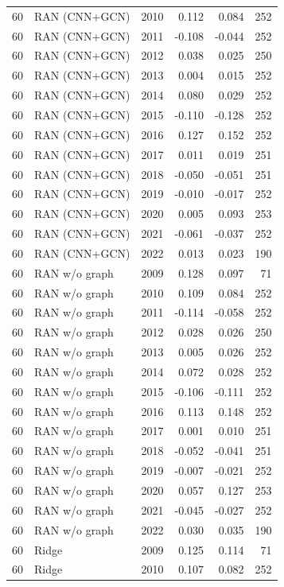\begin{table}[htbp]
{\begin{tabular}{llrrrr}
60 & RAN (CNN+GCN) & 2010 & 0.112 & 0.084 & 252 \\
60 & RAN (CNN+GCN) & 2011 & -0.108 & -0.044 & 252 \\
60 & RAN (CNN+GCN) & 2012 & 0.038 & 0.025 & 250 \\
60 & RAN (CNN+GCN) & 2013 & 0.004 & 0.015 & 252 \\
60 & RAN (CNN+GCN) & 2014 & 0.080 & 0.029 & 252 \\
60 & RAN (CNN+GCN) & 2015 & -0.110 & -0.128 & 252 \\
60 & RAN (CNN+GCN) & 2016 & 0.127 & 0.152 & 252 \\
60 & RAN (CNN+GCN) & 2017 & 0.011 & 0.019 & 251 \\
60 & RAN (CNN+GCN) & 2018 & -0.050 & -0.051 & 251 \\
60 & RAN (CNN+GCN) & 2019 & -0.010 & -0.017 & 252 \\
60 & RAN (CNN+GCN) & 2020 & 0.005 & 0.093 & 253 \\
60 & RAN (CNN+GCN) & 2021 & -0.061 & -0.037 & 252 \\
60 & RAN (CNN+GCN) & 2022 & 0.013 & 0.023 & 190 \\
60 & RAN w/o graph & 2009 & 0.128 & 0.097 & 71 \\
60 & RAN w/o graph & 2010 & 0.109 & 0.084 & 252 \\
60 & RAN w/o graph & 2011 & -0.114 & -0.058 & 252 \\
60 & RAN w/o graph & 2012 & 0.028 & 0.026 & 250 \\
60 & RAN w/o graph & 2013 & 0.005 & 0.026 & 252 \\
60 & RAN w/o graph & 2014 & 0.072 & 0.028 & 252 \\
60 & RAN w/o graph & 2015 & -0.106 & -0.111 & 252 \\
60 & RAN w/o graph & 2016 & 0.113 & 0.148 & 252 \\
60 & RAN w/o graph & 2017 & 0.001 & 0.010 & 251 \\
60 & RAN w/o graph & 2018 & -0.052 & -0.041 & 251 \\
60 & RAN w/o graph & 2019 & -0.007 & -0.021 & 252 \\
60 & RAN w/o graph & 2020 & 0.057 & 0.127 & 253 \\
60 & RAN w/o graph & 2021 & -0.045 & -0.027 & 252 \\
60 & RAN w/o graph & 2022 & 0.030 & 0.035 & 190 \\
60 & Ridge & 2009 & 0.125 & 0.114 & 71 \\
60 & Ridge & 2010 & 0.107 & 0.082 & 252 \\

\end{tabular}}
\end{table}
